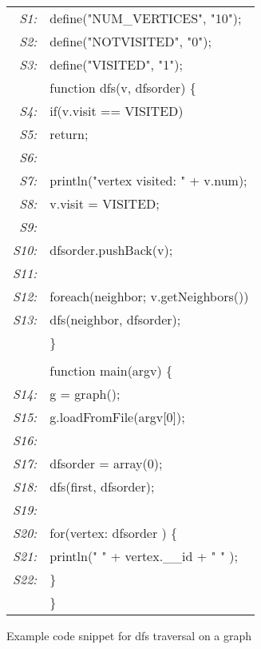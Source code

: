 \begin{figure}
\begin{center}
      {\small \tt
        \begin{tabular}[b]{rl}
          {\em \scriptsize S1:}&  define("NUM\_VERTICES", "10");\\
          {\em \scriptsize S2:}&  define("NOTVISITED", "0");\\
          {\em \scriptsize S3:}&  define("VISITED", "1"); \\
          &function dfs(v, dfsorder) \{ \\
          {\em \scriptsize S4:}&  \quad  if(v.visit == VISITED)\\
          {\em \scriptsize S5:}&  \quad  \quad return;\\
          {\em \scriptsize S6:}&  \quad   \\
          {\em \scriptsize S7:}&  \quad  println("vertex visited: " + v.num);\\
          {\em \scriptsize S8:}&  \quad  v.visit = VISITED;\\
          {\em \scriptsize S9:}&  \quad   \\
          {\em \scriptsize S10:}&  \quad  dfsorder.pushBack(v); \\
          {\em \scriptsize S11:}&  \quad   \\
          {\em \scriptsize S12:}&  \quad foreach(neighbor; v.getNeighbors())\\
          {\em \scriptsize S13:}&  \quad \quad dfs(neighbor, dfsorder); \\
          &\} \\
          &   \\
          &function main(argv) \{ \\
          {\em \scriptsize S14:}&  \quad  g = graph(); \\
          {\em \scriptsize S15:}&  \quad  g.loadFromFile(argv[0]);\\
          {\em \scriptsize S16:}&  \quad   \\
          {\em \scriptsize S17:}&  \quad  dfsorder = array(0);\\
          {\em \scriptsize S18:}&  \quad  dfs(first, dfsorder);\\
          {\em \scriptsize S19:}&  \quad   \\
          {\em \scriptsize S20:}&  \quad  for(vertex: dfsorder ) \{ \\
          {\em \scriptsize S21:}&  \quad \quad println(" " + vertex.\_\_id + " " 
              ); \\
          {\em \scriptsize S22:}& \quad \}\\
          &\}
        \end{tabular}
      }
\end{center}
  \caption{Example code snippet for dfs traversal on a graph}
  \label{fig:motiv_5}
\end{figure}
